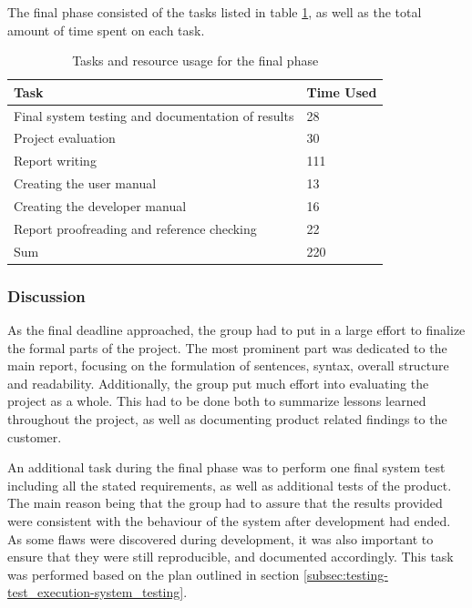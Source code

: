 The final phase consisted of the tasks listed in table \ref{tab:final_phase-tasks}, as well as the total amount of time spent on each task.

\begin{table}[ht!]
\small
\centering
\begin{tabular}{ | p{10cm} | p{2cm} |}
\hline
\rowcolor{lightgray}
\textbf{Task} & \textbf{Time Used} \\
\hline
Final system testing and documentation of results & 28 \\
Project evaluation & 30 \\
Report writing & 111 \\
Creating the user manual & 13 \\
Creating the developer manual & 16 \\
Report proofreading and reference checking & 22 \\
\hline \hline
Sum & 220 \\
\hline
\end{tabular}
\caption{Tasks and resource usage for the final phase}
\label{tab:final_phase-tasks}
\end{table}

\subsubsection{Discussion}

As the final deadline approached, the group had to put in a large effort to finalize the formal parts of the project. The most prominent part was dedicated to the main report, focusing on the formulation of sentences, syntax, overall structure and readability. Additionally, the group put much effort into evaluating the project as a whole. This had to be done both to summarize lessons learned throughout the project, as well as documenting product related findings to the customer.

An additional task during the final phase was to perform one final system test including all the stated requirements, as well as additional tests of the product. The main reason being that the group had to assure that the results provided were consistent with the behaviour of the system after development had ended. As some flaws were discovered during development, it was also important to ensure that they were still reproducible, and documented accordingly. This task was performed based on the plan outlined in section \ref{subsec:testing-test_execution-system_testing}.
